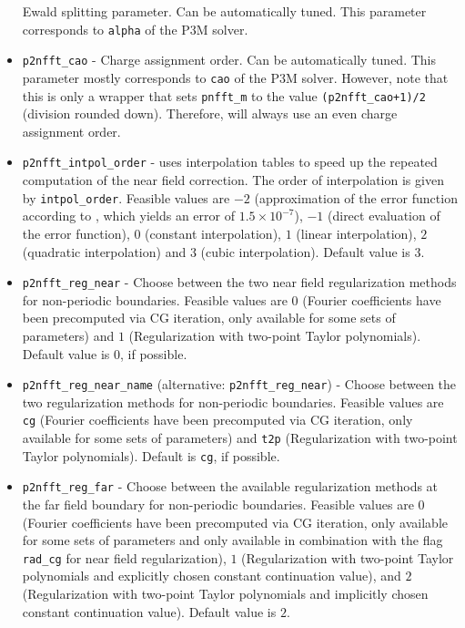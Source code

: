 \begin{itemize}
    Ewald splitting parameter. Can be automatically tuned.
    This parameter corresponds to \verb!alpha! of the P3M solver.
  \item \verb!p2nfft_cao! -
    Charge assignment order. Can be automatically tuned. This parameter mostly corresponds to \verb!cao! of the P3M solver.
    However, note that this is only a wrapper that sets \verb!pnfft_m! to the value \verb!(p2nfft_cao+1)/2! (division rounded down).
    Therefore, \ptwonfft will always use an even charge assignment order.
  \item \verb!p2nfft_intpol_order! -
    \ptwonfft uses interpolation tables to speed up the repeated computation of the near field correction. The order of interpolation is given by \verb!intpol_order!.
    Feasible values are $-2$ (approximation of the error function according to \cite[eq.~(7.1.26)]{AbSt72}, which yields an error of $1.5\times 10^{-7}$),
    $-1$ (direct evaluation of the error function), $0$ (constant interpolation), $1$ (linear interpolation), $2$ (quadratic interpolation) and $3$ (cubic interpolation).
    Default value is $3$.
  \item \verb!p2nfft_reg_near! -
    Choose between the two near field regularization methods for non-periodic boundaries. Feasible values are $0$ (Fourier coefficients have been precomputed via CG iteration, only available for some sets of parameters)
    and $1$ (Regularization with two-point Taylor polynomials). Default value is $0$, if possible.
  \item \verb!p2nfft_reg_near_name! (alternative: \verb!p2nfft_reg_near!) -
    Choose between the two regularization methods for non-periodic boundaries. Feasible values are \verb!cg! (Fourier coefficients have been precomputed via CG iteration, only available for some sets of parameters)
    and \verb!t2p! (Regularization with two-point Taylor polynomials). Default is \verb!cg!, if possible.
  \item \verb!p2nfft_reg_far! -
    Choose between the available regularization methods at the far field boundary for non-periodic boundaries.
    Feasible values are $0$ (Fourier coefficients have been precomputed via CG iteration, only available for some sets of parameters and only available in combination with the flag \verb!rad_cg! for near field regularization),
    $1$ (Regularization with two-point Taylor polynomials and explicitly chosen constant continuation value), and
    $2$ (Regularization with two-point Taylor polynomials and implicitly chosen constant continuation value). Default value is $2$.

\end{itemize}
